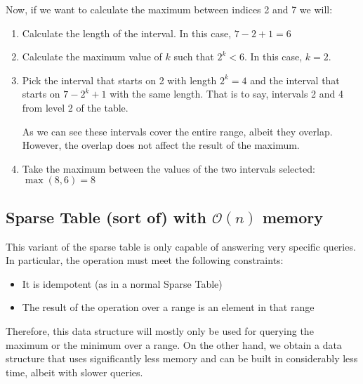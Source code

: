\begin{figure}[h!]
\end{figure}

\noindent
Now, if we want to calculate the maximum between indices 2 and 7 we will:
\begin{enumerate}
		\setlength{\itemsep}{2pt}
		\item Calculate the length of the interval. In this case, $7-2+1=6$
		\item Calculate the maximum value of $k$  such that $2^k<6$. In this
				case, $k=2$.
		\item Pick the interval that starts on 2 with length $2^k=4$ and the
				interval that starts on $7-2^k+1$ with the same length. 
				That is to say, intervals 2 and 4 from level 2 of the table.

				As we can see these intervals cover the entire range, albeit 
				they overlap. However, the overlap does not affect the result
				of the maximum.
		\item Take the maximum between the values of the two intervals 
				selected: $\max(8,6)=8$
\end{enumerate}

\newpage
{}
\newpage

\subsection{Sparse Table {\scriptsize(sort of)} with $\mathcal{O}(n)$ memory}

This variant of the sparse table is only capable of answering very
specific queries. In particular, the operation must meet the following
constraints:
\begin{itemize}
		\setlength{\itemsep}{2pt}
		\item It is idempotent (as in a normal Sparse Table)
		\item The result of the operation over a range is an element
				in that range
\end{itemize}
Therefore, this data structure will mostly only be used for querying the
maximum or the minimum over a range. On the other hand, we obtain a data 
structure that uses significantly less memory and can be built in
considerably less time, albeit with slower queries.
